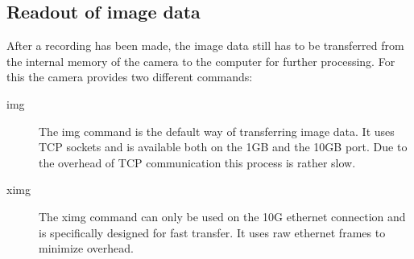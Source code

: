 \subsection{Readout of image data} \label{sec:phreadout}
After a recording has been made, the image data still has to be transferred from the internal memory of the camera to the computer for further processing. For this the camera provides two different commands:
\begin{description}
\item[img] The img command is the default way of transferring image data. It uses TCP sockets and is available both on the 1GB and the 10GB port. Due to the overhead of TCP communication this process is rather slow.
\item[ximg] The ximg command can only be used on the 10G ethernet connection and is specifically designed for fast transfer. It uses raw ethernet frames to minimize overhead.
\end{description}

